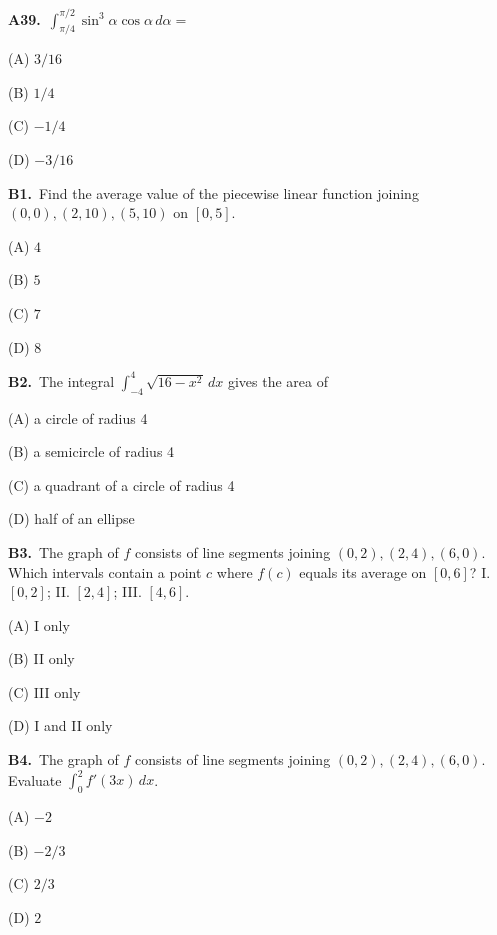 \documentclass[11pt]{article}
\begin{document}
\bigskip\noindent\textbf{A39.}\ $\int_{\pi/4}^{\pi/2}\sin^3\alpha\cos\alpha\,d\alpha=$
\begin{list}{}{\setlength{\leftmargin}{3em}\setlength{\labelwidth}{2.5em}\setlength{\itemsep}{0pt}\setlength{\topsep}{2pt}}
\item[(A)] $3/16$
\item[(B)] $1/4$
\item[(C)] $-1/4$
\item[(D)] $-3/16$
\end{list}

\bigskip\noindent\textbf{B1.}\ Find the average value of the piecewise linear function joining $(0,0),(2,10),(5,10)$ on $[0,5]$.
\begin{list}{}{\setlength{\leftmargin}{3em}\setlength{\labelwidth}{2.5em}\setlength{\itemsep}{0pt}\setlength{\topsep}{2pt}}
\item[(A)] $4$
\item[(B)] $5$
\item[(C)] $7$
\item[(D)] $8$
\end{list}

\bigskip\noindent\textbf{B2.}\ The integral $\int_{-4}^4\sqrt{16-x^2}\,dx$ gives the area of
\begin{list}{}{\setlength{\leftmargin}{3em}\setlength{\labelwidth}{2.5em}\setlength{\itemsep}{0pt}\setlength{\topsep}{2pt}}
\item[(A)] a circle of radius 4
\item[(B)] a semicircle of radius 4
\item[(C)] a quadrant of a circle of radius 4
\item[(D)] half of an ellipse
\end{list}

\bigskip\noindent\textbf{B3.}\ The graph of $f$ consists of line segments joining $(0,2),(2,4),(6,0)$. Which intervals contain a point $c$ where $f(c)$ equals its average on $[0,6]$? I. $[0,2]$; II. $[2,4]$; III. $[4,6]$.
\begin{list}{}{\setlength{\leftmargin}{3em}\setlength{\labelwidth}{2.5em}\setlength{\itemsep}{0pt}\setlength{\topsep}{2pt}}
\item[(A)] I only
\item[(B)] II only
\item[(C)] III only
\item[(D)] I and II only
\end{list}

\bigskip\noindent\textbf{B4.}\ The graph of $f$ consists of line segments joining $(0,2),(2,4),(6,0)$. Evaluate $\int_0^2f\prime(3x)\,dx$.
\begin{list}{}{\setlength{\leftmargin}{3em}\setlength{\labelwidth}{2.5em}\setlength{\itemsep}{0pt}\setlength{\topsep}{2pt}}
\item[(A)] $-2$
\item[(B)] $-2/3$
\item[(C)] $2/3$
\item[(D)] $2$
\end{list}
\end{document}

